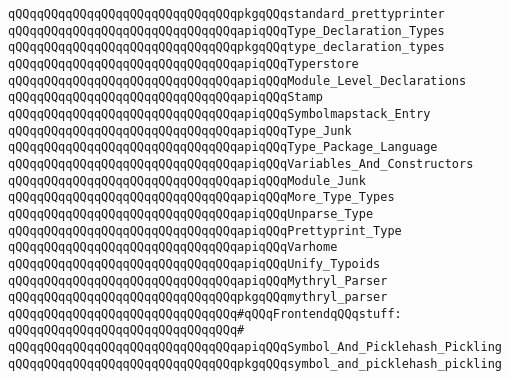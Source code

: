 \verb|qQQqqQQqqQQqqQQqqQQqqQQqqQQqqQQqpkgqQQqstandard_prettyprinter|\newline
\newline
\verb|qQQqqQQqqQQqqQQqqQQqqQQqqQQqqQQqapiqQQqType_Declaration_Types|\newline
\verb|qQQqqQQqqQQqqQQqqQQqqQQqqQQqqQQqpkgqQQqtype_declaration_types|\newline
\newline
\verb|qQQqqQQqqQQqqQQqqQQqqQQqqQQqqQQqapiqQQqTyperstore|\newline
\verb|qQQqqQQqqQQqqQQqqQQqqQQqqQQqqQQqapiqQQqModule_Level_Declarations|\newline
\verb|qQQqqQQqqQQqqQQqqQQqqQQqqQQqqQQqapiqQQqStamp|\newline
\verb|qQQqqQQqqQQqqQQqqQQqqQQqqQQqqQQqapiqQQqSymbolmapstack_Entry|\newline
\verb|qQQqqQQqqQQqqQQqqQQqqQQqqQQqqQQqapiqQQqType_Junk|\newline
\verb|qQQqqQQqqQQqqQQqqQQqqQQqqQQqqQQqapiqQQqType_Package_Language|\newline
\verb|qQQqqQQqqQQqqQQqqQQqqQQqqQQqqQQqapiqQQqVariables_And_Constructors|\newline
\verb|qQQqqQQqqQQqqQQqqQQqqQQqqQQqqQQqapiqQQqModule_Junk|\newline
\verb|qQQqqQQqqQQqqQQqqQQqqQQqqQQqqQQqapiqQQqMore_Type_Types|\newline
\verb|qQQqqQQqqQQqqQQqqQQqqQQqqQQqqQQqapiqQQqUnparse_Type|\newline
\verb|qQQqqQQqqQQqqQQqqQQqqQQqqQQqqQQqapiqQQqPrettyprint_Type|\newline
\verb|qQQqqQQqqQQqqQQqqQQqqQQqqQQqqQQqapiqQQqVarhome|\newline
\verb|qQQqqQQqqQQqqQQqqQQqqQQqqQQqqQQqapiqQQqUnify_Typoids|\newline
\newline
\verb|qQQqqQQqqQQqqQQqqQQqqQQqqQQqqQQqapiqQQqMythryl_Parser|\newline
\verb|qQQqqQQqqQQqqQQqqQQqqQQqqQQqqQQqpkgqQQqmythryl_parser|\newline
\newline
\verb|qQQqqQQqqQQqqQQqqQQqqQQqqQQqqQQq#qQQqFrontendqQQqstuff:|\newline
\verb|qQQqqQQqqQQqqQQqqQQqqQQqqQQqqQQq#|\newline
\verb|qQQqqQQqqQQqqQQqqQQqqQQqqQQqqQQqapiqQQqSymbol_And_Picklehash_Pickling|\newline
\verb|qQQqqQQqqQQqqQQqqQQqqQQqqQQqqQQqpkgqQQqsymbol_and_picklehash_pickling|\newline
